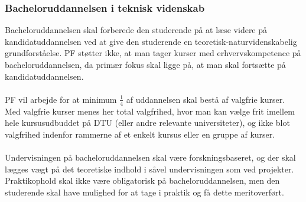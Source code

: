 \subsubsection{Bacheloruddannelsen i teknisk videnskab}
Bacheloruddannelsen skal forberede den studerende på at læse videre på kandidatuddannelsen ved at give den studerende en teoretisk-naturvidenskabelig grundforståelse. PF støtter ikke, at man tager kurser med erhvervskompetence på bacheloruddannelsen, da primær fokus skal ligge på, at man skal fortsætte på kandidatuddannelsen.\\
\\
PF vil arbejde for at minimum $\frac{1}{4}$ af uddannelsen skal bestå af valgfrie kurser. Med valgfrie kurser menes her total valgfrihed, hvor man kan vælge frit imellem hele kursusudbuddet på DTU (eller andre relevante universiteter), og ikke blot valgfrihed indenfor rammerne af et enkelt kursus eller en gruppe af kurser.\\
\\
Undervisningen på bacheloruddannelsen skal være forskningsbaseret, og der skal lægges vægt på det teoretiske indhold i såvel undervisningen som ved projekter. Praktikophold skal ikke være obligatorisk på bacheloruddannelsen, men den studerende skal have mulighed for at tage i praktik og få dette meritoverført.

